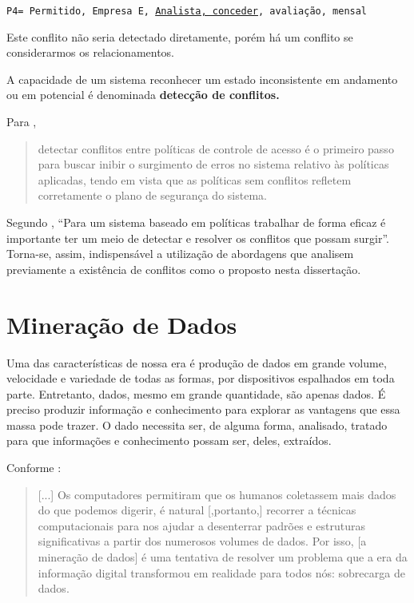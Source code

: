 {\scriptsize \texttt{P4= {Permitido, Empresa E, \underline{Analista, conceder}, avaliação, mensal}}}

Este conflito não seria detectado diretamente, porém há um conflito se considerarmos os relacionamentos.

A capacidade de um sistema reconhecer um estado inconsistente em andamento ou em potencial é denominada \textbf{detecção de conflitos.}

Para \cite{sarkis2017},
\begin{quote}
	detectar conflitos entre políticas de controle de acesso é o primeiro passo para buscar inibir o surgimento de erros no sistema relativo às políticas aplicadas, tendo em vista que as políticas sem conflitos refletem corretamente o plano de segurança do sistema.
\end{quote}

Segundo \cite[p.25]{sarkis2017}, ``Para um sistema baseado em políticas trabalhar de forma eficaz é importante ter um meio de detectar e resolver os conflitos que possam surgir''. Torna-se, assim, indispensável a utilização de abordagens que analisem previamente a existência de conflitos como o proposto nesta dissertação.


\section{Mineração de Dados}\label{mineracao_dados}
Uma das características de nossa era é produção de dados em grande volume, velocidade e variedade de todas as formas, por dispositivos espalhados em toda parte. Entretanto, dados, mesmo em grande quantidade, são apenas dados. É preciso produzir informação e conhecimento para explorar as vantagens que essa massa pode trazer. O dado necessita ser, de alguma forma, analisado, tratado para que informações e conhecimento possam ser, deles, extraídos. \cite{aprenda_mineracao_fernando_amaral16} \cite{ferrari2017}

Conforme \cite{fayyad1996}:
\begin{quotation}
	[...] Os computadores permitiram que os humanos coletassem mais dados do que podemos digerir, é natural [,portanto,] recorrer a técnicas computacionais para nos ajudar a desenterrar padrões e estruturas significativas a partir dos numerosos volumes de dados. Por isso, [a mineração de dados] é uma tentativa de resolver um problema que a era da informação digital transformou em realidade para todos nós: sobrecarga de dados.
\end{quotation}

